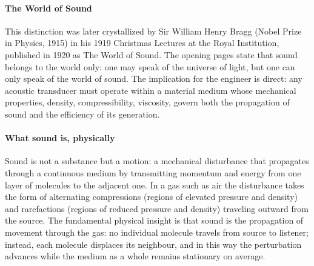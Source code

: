 \paragraph{The World of Sound} This distinction was later crystallized by Sir William Henry Bragg (Nobel Prize in Physics, 1915) in his 1919 Christmas Lectures at the Royal Institution, published in 1920 as The World of Sound. The opening pages state that sound belongs to the world only: one may speak of the universe of light, but one can only speak of the world of sound. The implication for the engineer is direct: any acoustic transducer must operate within a material medium whose mechanical properties, density, compressibility, viscosity, govern both the propagation of sound and the efficiency of its generation.

\paragraph{What sound is, physically} Sound is not a substance but a motion: a mechanical disturbance that propagates through a continuous medium by transmitting momentum and energy from one layer of molecules to the adjacent one. In a gas such as air the disturbance takes the form of alternating compressions (regions of elevated pressure and density) and rarefactions (regions of reduced pressure and density) traveling outward from the source. The fundamental physical insight is that sound is the propagation of movement through the gas: no individual molecule travels from source to listener; instead, each molecule displaces its neighbour, and in this way the perturbation advances while the medium as a whole remains stationary on average.

